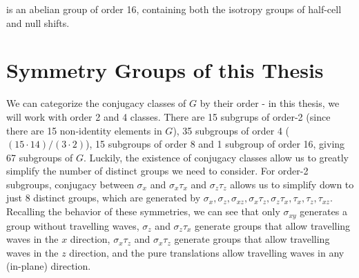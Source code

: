is an abelian group of order 16, containing both the isotropy groups of half-cell and null shifts.

\section{Symmetry Groups of this Thesis}

We can categorize the conjugacy classes of $G$ by their order - in this thesis, we will work with order 2 and 4 classes. There are 15 subgrups of order-2 (since there are 15 non-identity elements in $G$), 35 subgroups of order 4 ($(15\cdot14) /(3\cdot2)$), 15 subgroups of order 8 and 1 subgroup of order 16, giving 67 subgroups of $G$. Luckily, the existence of conjugacy classes allow us to greatly simplify the number of distinct groups we need to consider. For order-2 subgroups, conjugacy between $\sigma_x$ and $\sigma_x\tau_x$ and $\sigma_z\tau_z$ allows us to simplify down to just 8 distinct groups, which are generated by $\sigma_x,\sigma_z,\sigma_{xz},\sigma_x\tau_z,\sigma_z\tau_x,\tau_x,\tau_z,\tau_{xz}$. Recalling the behavior of these symmetries, we can see that only $\sigma_{xy}$ generates a group without travelling waves, $\sigma_z$ and $\sigma_z\tau_x$ generate groups that allow travelling waves in the $x$ direction, $\sigma_x\tau_z$ and $\sigma_x\tau_z$ generate groups that allow travelling waves in the $z$ direction, and the pure translations allow travelling waves in any (in-plane) direction. \\

  
